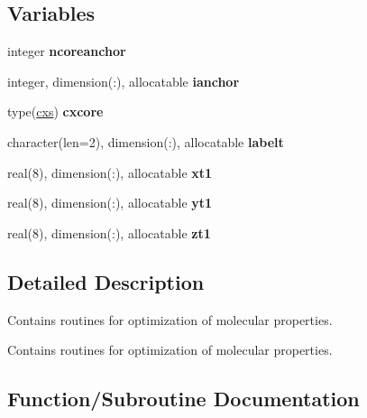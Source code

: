 \subsection*{Variables}
\begin{DoxyCompactItemize}
\item 
\mbox{\label{namespacemoleculeopt_af963dfb027ae1c99874430315dbd6aa4}} 
integer {\bfseries ncoreanchor}
\item 
\mbox{\label{namespacemoleculeopt_a0eaf6ae6fdad2df15571ca32dd853cef}} 
integer, dimension(\+:), allocatable {\bfseries ianchor}
\item 
\mbox{\label{namespacemoleculeopt_a48ff3240018d4f2cb06c614d226dd04c}} 
type(\mbox{\hyperlink{structchemstr_1_1cxs}{cxs}}) {\bfseries cxcore}
\item 
\mbox{\label{namespacemoleculeopt_abc7ebaf0132d242eaf339a0d228985cc}} 
character(len=2), dimension(\+:), allocatable {\bfseries labelt}
\item 
\mbox{\label{namespacemoleculeopt_a2bc094d122ad292be2b394774f71fed4}} 
real(8), dimension(\+:), allocatable {\bfseries xt1}
\item 
\mbox{\label{namespacemoleculeopt_a84c2d49c8b2d8e4a99678d40bfc11f78}} 
real(8), dimension(\+:), allocatable {\bfseries yt1}
\item 
\mbox{\label{namespacemoleculeopt_ae8a73dcad6192b0fc092cb134450c429}} 
real(8), dimension(\+:), allocatable {\bfseries zt1}
\end{DoxyCompactItemize}


\subsection{Detailed Description}
Contains routines for optimization of molecular properties. 

Contains routines for optimization of molecular properties. 

\subsection{Function/\+Subroutine Documentation}
\mbox{\label{namespacemoleculeopt_a456ab3eee90f480fc542c9869a06acc6}} 
